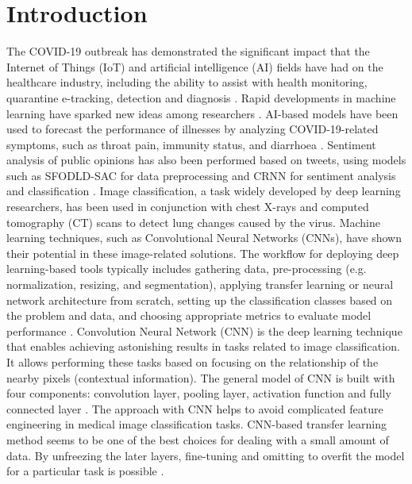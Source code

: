 \documentclass[runningheads]{llncs}
\begin{document}
\section{Introduction}
The COVID-19 outbreak has demonstrated the significant impact that the Internet of Things (IoT) and artificial intelligence (AI) fields have had on the healthcare industry, including the ability to assist with health monitoring, quarantine e-tracking, detection and diagnosis \cite{ITcovidReview}. Rapid developments in machine learning have sparked new ideas among researchers \cite{MLDLcovidReview}. AI-based models have been used to forecast the performance of illnesses by analyzing COVID-19-related symptoms, such as throat pain, immunity status, and diarrhoea \cite{covidForecasting}. Sentiment analysis of public opinions has also been performed based on tweets, using models such as SFODLD-SAC for data preprocessing and CRNN for sentiment analysis and classification \cite{sentimentTweets}. Image classification, a task widely developed by deep learning researchers, has been used in conjunction with chest X-rays and computed tomography (CT) scans to detect lung changes caused by the virus. Machine learning techniques, such as Convolutional Neural Networks (CNNs), have shown their potential in these image-related solutions. The workflow for deploying deep learning-based tools typically includes gathering data, pre-processing (e.g. normalization, resizing, and segmentation), applying transfer learning or neural network architecture from scratch, setting up the classification classes based on the problem and data, and choosing appropriate metrics to evaluate model performance \cite{MLDLimageReview}.
\newline
\indent
Convolution Neural Network (CNN) is the deep learning technique that enables achieving astonishing results in tasks related to image classification. It allows performing these tasks based on focusing on the relationship of the nearby pixels (contextual information). The general model of CNN is built with four components: convolution layer, pooling layer, activation function and fully connected layer \cite{CNNexplanation}. The approach with CNN helps to avoid complicated feature engineering in medical image classification tasks. CNN-based transfer learning method seems to be one of the best choices for dealing with a small amount of data. By unfreezing the later layers, fine-tuning and omitting to overfit the model for a particular task is possible \cite{CNNmedicalimageclassification}.
\newline
\end{document}
